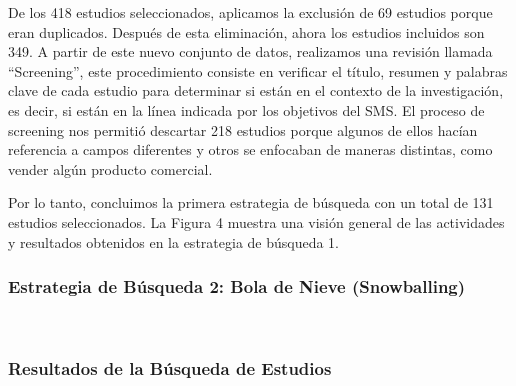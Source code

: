 De los 418 estudios seleccionados, aplicamos la exclusión de 69 estudios porque eran duplicados. Después de esta eliminación, ahora los estudios incluidos son 349. A partir de este nuevo conjunto de datos, realizamos una revisión llamada ``Screening'', este procedimiento consiste en verificar el título, resumen y palabras clave de cada estudio para determinar si están en el contexto de la investigación, es decir, si están en la línea indicada por los objetivos del SMS. El proceso de screening nos permitió descartar 218 estudios porque algunos de ellos hacían referencia a campos diferentes y otros se enfocaban de maneras distintas, como vender algún producto comercial.

Por lo tanto, concluimos la primera estrategia de búsqueda con un total de 131 estudios seleccionados. La Figura 4 muestra una visión general de las actividades y resultados obtenidos en la estrategia de búsqueda 1.

\subsubsection{Estrategia de Búsqueda 2: Bola de Nieve (Snowballing)}
\mbox{}\\

\subsubsection{Resultados de la Búsqueda de Estudios}\label{subsubsec:resultados-busqueda}
\mbox{}\\